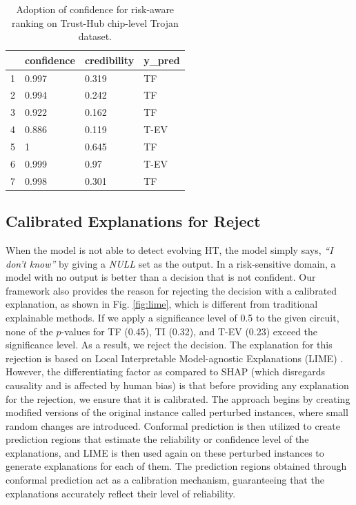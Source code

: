 \begin{table}[t]
\centering
\caption{Adoption of confidence for risk-aware ranking on Trust-Hub chip-level Trojan dataset.}
\begin{tabular}{llll}
\hline
  & \textbf{confidence} & \textbf{credibility} & \textbf{y\_pred} \\ \hline
1 & 0.997               & 0.319                & TF               \\ \hline
2 & 0.994               & 0.242                & TF               \\ \hline
3 & 0.922               & 0.162                & TF               \\ \hline
4 & 0.886               & 0.119                & T-EV             \\ \hline
5 & 1                   & 0.645                & TF               \\ \hline
6 & 0.999               & 0.97                 & T-EV             \\ \hline
7 & 0.998               & 0.301                & TF               \\ \hline
\end{tabular}
\label{tab:confcred}
\end{table}



\subsection*{Calibrated Explanations for Reject}
\label{Sec:explain}
When the model is not able to detect evolving HT, the model simply says, \textit{``I don't know''} by giving a \textit{NULL} set as the output. In a risk-sensitive domain, a model with no output is better than a decision that is not confident. Our framework also provides the reason for rejecting the decision with a calibrated explanation, as shown in Fig. \ref{fig:lime}, which is different from traditional explainable methods. If we apply a significance level of 0.5 to the given circuit, none of the $p$-values for TF (0.45), TI (0.32), and T-EV (0.23) exceed the significance level. As a result, we reject the decision. The explanation for this rejection is based on Local Interpretable Model-agnostic Explanations (LIME) \cite{dieber2020model}. However, the differentiating factor as compared to SHAP (which disregards causality and is affected by human bias) is that before providing any explanation for the rejection, we ensure that it is calibrated. The approach begins by creating modified versions of the original instance called perturbed instances, where small random changes are introduced. Conformal prediction is then utilized to create prediction regions that estimate the reliability or confidence level of the explanations, and LIME is then used again on these perturbed instances to generate explanations for each of them. The prediction regions obtained through conformal prediction act as a calibration mechanism, guaranteeing that the explanations accurately reflect their level of reliability. 

